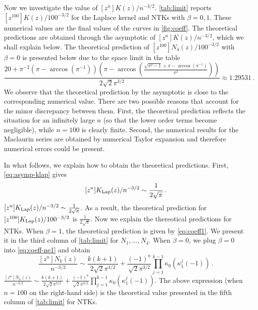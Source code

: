 \documentclass[11pt]{article}
\newcommand{\g}{\kappa_1}
\newcommand{\klap}{K_{\textnormal{Lap}}}
\begin{document}
Now we investigate the value of $[z^n]K(z)/n^{-3/2}$. \cref{tab:limit} reports $[z^{100}]K(z)/100^{-3/2}$ for the Laplace kernel and NTKs with $\beta=0,1$. These numerical values are the final values of the curves in \cref{fig:coeff}. The theoretical predictions are obtained through the asymptotic of $[z^n]K(z)/n^{-3/2}$, which we shall explain below. The theoretical prediction of $[z^{100}]N_4(z)/100^{-3/2}$ with $\beta=0$ is presented below due to the space limit in the table  \begin{equation}\label{eq:cell}
    \frac{20+\pi ^{-2}\left(\pi -\arccos\left(\pi^{-1}\right)\right) \left(\pi -\arccos\left(\frac{\sqrt{\pi ^2-1}+\pi -\arccos \left(\pi^{-1}\right)}{\pi ^2}\right)\right)}{2 \sqrt{2} \pi ^{3/2}} \approx 1.29531\,.
\end{equation}
We observe that the theoretical prediction by the asymptotic is close to the corresponding numerical value. There are two possible reasons that account for the minor discrepancy between them. First, the theoretical prediction reflects the situation for an infinitely large $n$ (so that the lower order terms become negligible), while $n=100$ is clearly finite. Second, the numerical results for the Maclaurin series are obtained by numerical Taylor expansion and therefore numerical errors could be present. 

In what follows, we explain how to obtain the theoretical predictions. First, \eqref{eq:asymp-klap} gives 
\ifarxiv
\[
[z^n]\klap(z)/n^{-3/2} \sim \frac{1}{2\sqrt{\pi}}\,.
\]
\else
$[z^n]\klap(z)/n^{-3/2} \sim \frac{1}{2\sqrt{\pi}}$.
\fi
As a result, the theoretical prediction for $[z^{100}]\klap(z)/100^{-3/2}$ is $\frac{1}{2\sqrt{\pi}}$. 
Now we explain the thereotical predictions for NTKs. 
When $\beta=1$, the theoretical prediction is given by \eqref{eq:coeff1}. 
We present it in the third column of \cref{tab:limit} for $N_1,\dots,N_4$. 
When $\beta=0$, we plug $\beta = 0$ into \eqref{eq:coeff-ne1} and obtain
\ifarxiv
\[
\frac{[z^n]N_k(z)}{n^{-3/2}} \sim \frac{k (k+1)}{2 \sqrt{2} \pi ^{3/2}} + \frac{(-1)^n}{\sqrt{2} \pi ^{3/2}}\prod_{j=1}^{k-1} \kappa_0(\g^{j}(-1))
\,.\]
\else
$
\frac{[z^n]N_k(z)}{n^{-3/2}} \sim \frac{k (k+1)}{2 \sqrt{2} \pi ^{3/2}} + \frac{(-1)^n}{\sqrt{2} \pi ^{3/2}}\prod_{j=1}^{k-1} \kappa_0(\g^{j}(-1))
$.
\fi
The above expression (when $n=100$ on the right-hand side) is the theoretical value presented in the fifth column of \cref{tab:limit} for NTKs. 
\end{document}
